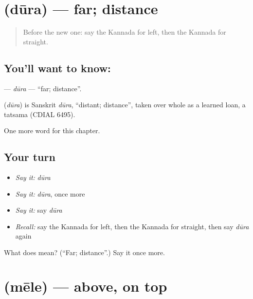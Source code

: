 \section[\texorpdfstring{\kn{ದೂರ} (dūra)}{ದೂರ (dūra)}]{ (dūra) — far; distance}

\label{lesson:KA-C107-dura}



\begin{quote}
Before the new one: say the Kannada for left, then the Kannada for straight.
\end{quote}

\subsection*{You'll want to know: }
\textbf{} — \emph{dūra} — \textquotedblleft{}far; distance\textquotedblright{}.

\begin{cousinweb}
\textbf{} (\emph{dūra}) is Sanskrit \emph{dūra}, \textquotedblleft{}distant; distance\textquotedblright{}, taken over whole as a learned loan, a tatsama (CDIAL 6495).
\end{cousinweb}

\begin{grammarlens}[title={What you've built}]
One more word for this chapter.
\end{grammarlens}

\subsection*{Your turn}
\begin{itemize}
\raggedright
  \item \emph{Say it:} \emph{dūra}
  \item \emph{Say it:} \emph{dūra}, once more
  \item \emph{Say it:} say \emph{dūra}
  \item \emph{Recall:} say the Kannada for left, then the Kannada for straight, then say \emph{dūra} again
\end{itemize}

\begin{tcolorbox}[breakable,colback=teal!4,colframe=teal!35!black,title={Before you move on}]
What does  mean? (\textquotedblleft{}Far; distance\textquotedblright{}.) Say it once more.
\end{tcolorbox}
\section[\texorpdfstring{\kn{ಮೇಲೆ} (mēle)}{ಮೇಲೆ (mēle)}]{ (mēle) — above, on top}

